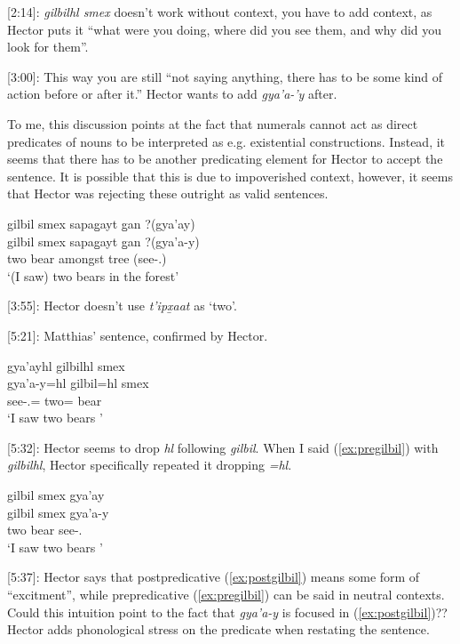 [2:14]: \textit{gilbilhl smex} doesn't work without context, you have to add context, as Hector puts it ``what were you doing, where did you see them, and why did you look for them''.
 
[3:00]: This way you are still ``not saying anything, there has to be some kind of action before or after it.'' Hector wants to add \textit{gya'a-'y} after. 

To me, this discussion points at the fact that numerals cannot act as direct predicates of nouns to be interpreted as e.g. existential constructions. Instead, it seems that there has to be another predicating element for Hector to accept the sentence. It is possible that this is due to impoverished context, however, it seems that Hector was rejecting these outright as valid sentences.  

\begin{exe}
    \ex \glll gilbil smex sapag̱ayt g̱an ?(gya'ay)\\
    gilbil smex sapag̱ayt g̱an ?(gya'a-y)\\
    two bear amongst tree (see-\Fsg{}.\Ii{})\\
    `(I saw) two bears in the forest'
\end{exe}

[3:55]: Hector doesn't use \textit{t'ipx̱aat} as `two'.

[5:21]: Matthias' sentence, confirmed by Hector.

\begin{exe}
    \ex \label{ex:postgilbil} \glll gya'ayhl gilbilhl smex \\
    gya'a-y=hl gilbil=hl smex \\
    see-\Fsg{}.\Ii{}=\Cn{} two=\Cn{} bear \\
    `I saw two bears '
\end{exe}

[5:32]: Hector seems to drop \textit{hl} following \textit{gilbil}. When I said (\ref{ex:pregilbil}) with \textit{gilbilhl}, Hector specifically repeated it dropping \textit{=hl}.

\begin{exe}
    \ex \label{ex:pregilbil} \glll gilbil smex gya'ay \\
    gilbil smex gya'a-y \\
    two bear see-\Fsg{}.\Ii{} \\
    `I saw two bears '
\end{exe}

[5:37]: Hector says that postpredicative (\ref{ex:postgilbil}) means some form of ``excitment'', while prepredicative (\ref{ex:pregilbil}) can be said in neutral contexts. Could this intuition point to the fact that \textit{gya'a-y} is focused in (\ref{ex:postgilbil})?? Hector adds phonological stress on the predicate when restating the sentence.

